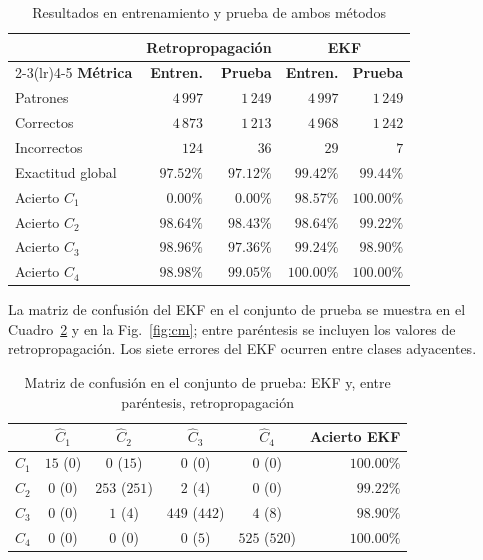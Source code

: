 \documentclass[conference]{IEEEtran}
\begin{document}
\begin{table}[htbp]
\caption{Resultados en entrenamiento y prueba de ambos métodos}
\label{tab:desempeno}
\begin{center}
\setlength{\tabcolsep}{4pt}
\begin{tabular}{lrrrr}
\toprule
 & \multicolumn{2}{c}{\textbf{Retropropagación}} & \multicolumn{2}{c}{\textbf{EKF}} \\
\cmidrule(lr){2-3}\cmidrule(lr){4-5}
\textbf{Métrica} & \textbf{Entren.} & \textbf{Prueba} & \textbf{Entren.} & \textbf{Prueba} \\
\midrule
Patrones          & $4\,997$  & $1\,249$  & $4\,997$  & $1\,249$ \\
Correctos         & $4\,873$  & $1\,213$  & $4\,968$  & $1\,242$ \\
Incorrectos       & $124$     & $36$      & $29$      & $7$ \\
Exactitud global  & $97.52\%$ & $97.12\%$ & $99.42\%$ & $99.44\%$ \\
\midrule
Acierto $C_1$     & $0.00\%$  & $0.00\%$  & $98.57\%$ & $100.00\%$ \\
Acierto $C_2$     & $98.64\%$ & $98.43\%$ & $98.64\%$ & $99.22\%$ \\
Acierto $C_3$     & $98.96\%$ & $97.36\%$ & $99.24\%$ & $98.90\%$ \\
Acierto $C_4$     & $98.98\%$ & $99.05\%$ & $100.00\%$ & $100.00\%$ \\
\bottomrule
\end{tabular}
\end{center}
\end{table}

La matriz de confusión del EKF en el conjunto de prueba se muestra en el
Cuadro~\ref{tab:cm} y en la Fig.~\ref{fig:cm}; entre paréntesis se incluyen
los valores de retropropagación. Los siete errores del EKF ocurren entre
clases adyacentes.

\begin{table}[htbp]
\caption{Matriz de confusión en el conjunto de prueba: EKF y, entre paréntesis, retropropagación}
\label{tab:cm}
\begin{center}
\setlength{\tabcolsep}{3pt}
\begin{tabular}{c|cccc|r}
\toprule
 & $\hat{C}_1$ & $\hat{C}_2$ & $\hat{C}_3$ & $\hat{C}_4$ & \textbf{Acierto EKF} \\
\midrule
$C_1$ & $15$ ($0$) & $0$ ($15$)    & $0$ ($0$)     & $0$ ($0$)     & $100.00\%$ \\
$C_2$ & $0$ ($0$)  & $253$ ($251$) & $2$ ($4$)     & $0$ ($0$)     & $99.22\%$ \\
$C_3$ & $0$ ($0$)  & $1$ ($4$)     & $449$ ($442$) & $4$ ($8$)     & $98.90\%$ \\
$C_4$ & $0$ ($0$)  & $0$ ($0$)     & $0$ ($5$)     & $525$ ($520$) & $100.00\%$ \\
\bottomrule
\end{tabular}
\end{center}
\end{table}
\end{document}
